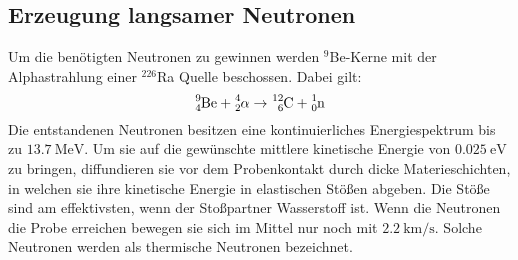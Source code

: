  \subsection{Erzeugung langsamer Neutronen}
 Um die benötigten Neutronen zu gewinnen werden $^9$Be-Kerne mit der Alphastrahlung einer $^{226}$Ra Quelle beschossen. Dabei gilt:
\begin{equation}
  \ce{^{9}_{4}Be} + \ce{^{4}_{2}\alpha} \rightarrow \ce{^{12}_{6}C} + \ce{^{1}_{0}n}
\end{equation}
 Die entstandenen Neutronen besitzen eine kontinuierliches Energiespektrum bis zu $\SI{13.7}{\mega\electronvolt}$. Um sie auf die gewünschte mittlere kinetische Energie von $\SI{0.025}{\electronvolt}$ zu bringen, diffundieren sie vor dem Probenkontakt durch dicke Materieschichten, in welchen sie ihre kinetische Energie in elastischen Stößen abgeben. Die Stöße sind am effektivsten, wenn der Stoßpartner Wasserstoff ist. Wenn die Neutronen die Probe erreichen bewegen sie sich im Mittel nur noch mit $\SI{2.2}{\kilo\meter\per\second}$. Solche Neutronen werden als thermische Neutronen bezeichnet.
